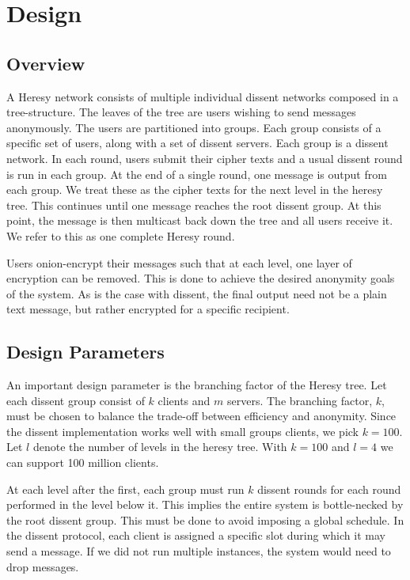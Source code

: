 \section{Design}
\subsection{Overview}
A Heresy network consists of multiple individual dissent networks composed in a tree-structure. The leaves of the tree are users wishing to send messages anonymously. The users are partitioned into groups. Each group consists of a specific set of users, along with a set of dissent servers. Each group is a dissent network. In each round, users submit their cipher texts and a usual dissent round is run in each group. At the end of a single round, one message is output from each group. We treat these as the cipher texts for the next level in the heresy tree. This continues until one message reaches the root dissent group. At this point, the message is then multicast back down the tree and all users receive it. We refer to this as one complete Heresy round.

Users onion-encrypt their messages such that at each level, one layer of encryption can be removed. This is done to achieve the desired anonymity goals of the system. As is the case with dissent, the final output need not be a plain text message, but rather encrypted for a specific recipient.

\subsection{Design Parameters}

An important design parameter is the branching factor of the Heresy tree. Let each dissent group consist of $k$ clients and $m$ servers. The branching factor, $k$, must be chosen to balance the trade-off between efficiency and anonymity. Since the dissent implementation works well with small groups clients, we pick $k=100$. Let $l$ denote the number of levels in the heresy tree. With $k=100$ and $l=4$ we can support 100 million clients.

At each level after the first, each group must run $k$ dissent rounds for each round performed in the level below it. This implies the entire system is bottle-necked by the root dissent group. This must be done to avoid imposing a global schedule. In the dissent protocol, each client is assigned a specific slot during which it may send a message. If we did not run multiple instances, the system would need to drop messages. 


